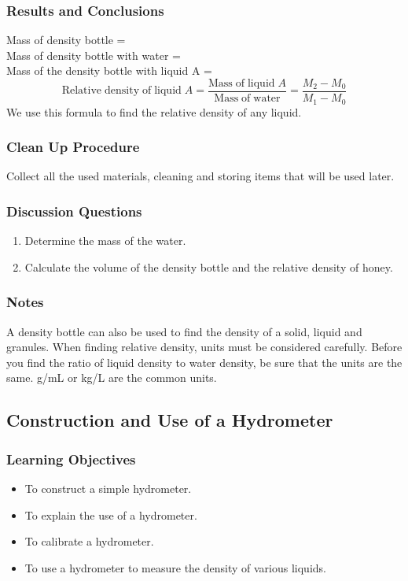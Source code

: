 \subsubsection*{Results and Conclusions}
Mass of density bottle = \\
Mass of density bottle with water = \\
Mass of the density bottle with liquid A = \\
$$\mathrm{Relative \;density \;of \;liquid \;}A = \frac{\mathrm{Mass \;of \;liquid \;}A}{\mathrm{Mass \;of \;water}} = \frac{M_2-M_0}{M_1-M_0}$$
We use this formula to find the relative density of any liquid.

\subsubsection*{Clean Up Procedure}
Collect all the used materials, cleaning and storing items that will be used later.

\subsubsection*{Discussion Questions}
\begin{enumerate}
\item{Determine the mass of the water.} 
\item{Calculate the volume of the density bottle and the relative density of honey.} 
\end{enumerate}

\subsubsection*{Notes}
A density bottle can also be used to find the density of a solid, liquid and granules.
When finding relative density, units must be considered carefully.  Before you find the ratio of liquid density to water density, be sure that the units are the same.  g/mL or kg/L are the common units.

\subsection{Construction and Use of a Hydrometer}

\subsubsection*{Learning Objectives}
\begin{itemize}
\item{To construct a simple hydrometer.} 
\item{To explain the use of a hydrometer.} 
\item{To calibrate a hydrometer.} 
\item{To use a hydrometer to measure the density of various liquids.} 
\end{itemize}

